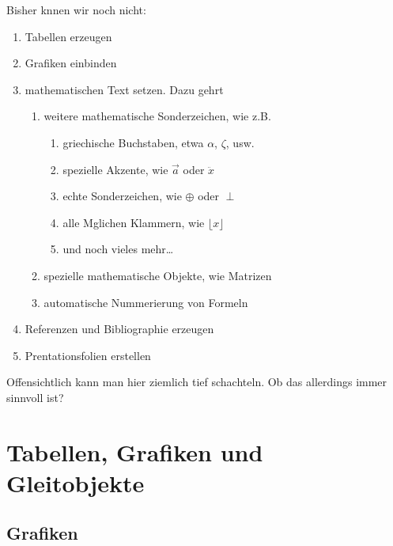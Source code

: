 \documentclass[11pt,a4paper]{article} %
\begin{document}
Bisher knnen wir noch nicht:

\begin{enumerate}
 \item Tabellen erzeugen
 \item Grafiken einbinden
 \item mathematischen Text setzen. Dazu gehrt
    \begin{enumerate}
       \item weitere mathematische Sonderzeichen, wie z.B.
           \begin{enumerate}
               \item griechische Buchstaben, etwa $\alpha$, $\zeta$, usw.
               \item spezielle Akzente, wie $\vec{a}$ oder $\ddot{x}$
               \item echte Sonderzeichen, wie $\oplus$ oder $\perp$
               \item alle Mglichen Klammern, wie $\lfloor x \rfloor$
               \item und noch vieles mehr\ldots
           \end{enumerate}
       \item spezielle mathematische Objekte, wie Matrizen
       \item automatische Nummerierung von Formeln
    \end{enumerate}
 \item Referenzen und Bibliographie erzeugen
 \item Prentationsfolien erstellen
\end{enumerate}

Offensichtlich kann man hier ziemlich tief schachteln. Ob das allerdings immer sinnvoll ist?



\section{Tabellen, Grafiken und Gleitobjekte}
\label{TabellenGrafikenFloats}


\subsection{Grafiken}
\label{Grafiken}
\end{document}
